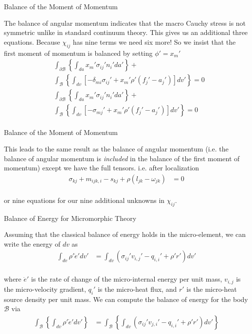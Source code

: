 \documentclass[11pt]{beamer}
\begin{document}
\begin{frame}{Balance of the Moment of Momentum}

The balance of angular momentum indicates that the macro Cauchy stress is not symmetric unlike in standard continuum theory. This gives us an additional three equations. Because $\chi_{ij}$ has nine terms we need six more! So we insist that the first moment of momentum is balanced by setting $\phi' = x_{m}'$
\begin{align*}
&\int_{\partial \mathcal{B}} \left\{\int_{da} x_m' \sigma_{ij}' n_i' da'\right\} +\\
&\int_{\mathcal{B}} \left\{\int_{dv} \left[ - \delta_{mi} \sigma_{ij}' +  x_m'\rho'\left(f_j' - a_j'\right) \right]dv'\right\} = 0\\
&\int_{\partial \mathcal{B}} \left\{\int_{da} x_m' \sigma_{ij}' n_i' da'\right\} +\\
&\int_{\mathcal{B}} \left\{\int_{dv} \left[ - \sigma_{mj}' + x_m'\rho'\left(f_j' - a_j'\right) \right]dv'\right\} = 0\\
\end{align*}

\end{frame}

\begin{frame}{Balance of the Moment of Momentum}

This leads to the same result as the balance of angular momentum (i.e. the balance of angular momentum is \textit{included} in the balance of the first moment of momentum) except we have the full tensors. i.e. after localization
\begin{align*}
\sigma_{kj} + m_{ijk,i} - s_{kj} + \rho\left(l_{jk} - \omega_{jk}\right) &= 0\\
\end{align*}

or nine equations for our nine additional unknowns in $\chi_{ij}$.

\end{frame}

\begin{frame}{Balance of Energy for Micromorphic Theory}

Assuming that the classical balance of energy holds in the micro-element, we can write the energy of $dv$ as
\begin{align*}
\int_{dv} \rho' \dot{e}' dv' &= \int_{dv} \left(\sigma_{ij}' v_{i,j}' - q_{i,i}' + \rho' r' \right) dv'\\
\end{align*}

where $\dot{e}'$ is the rate of change of the micro-internal energy per unit mass, $v_{i,j}$ is the micro-velocity gradient, $q_i'$ is the micro-heat flux, and $r'$ is the micro-heat source density per unit mass. We can compute the balance of energy for the body $\mathcal{B}$ via
\begin{align*}
\int_{\mathcal{B}} \left\{\int_{dv} \rho' \dot{e}' dv'\right\} &= \int_{\mathcal{B}}\left\{\int_{dv} \left(\sigma_{ij}' v_{j,i}' - q_{i,i}' + \rho' r' \right) dv'\right\}\\
\end{align*}

\end{frame}
\end{document}
